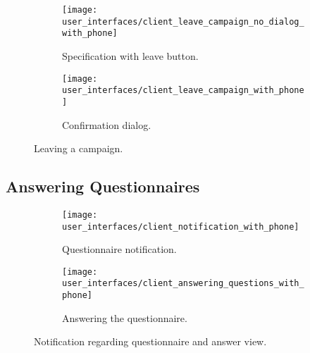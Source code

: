 \begin{figure}[!htbp]
\begin{subfigure}[!t]{.50\textwidth}
  \centering
  \texttt{[image: user\_interfaces/client\_leave\_campaign\_no\_dialog\_with\_phone]}
  \caption{Specification with leave button.}
  \label{fig:leave_campaign_no_dialog}
\end{subfigure}%
\begin{subfigure}[!t]{.50\textwidth}
  \centering
  \texttt{[image: user\_interfaces/client\_leave\_campaign\_with\_phone]}
  \caption{Confirmation dialog.}
  \label{fig:leave_campaign_dialog}
\end{subfigure}
\caption{Leaving a campaign.}
\label{fig:leave_campaign}
\end{figure}
\FloatBarrier

\subsection{Answering Questionnaires}

\begin{figure}[!htbp]
\begin{subfigure}[!t]{.50\textwidth}
  \centering
  \texttt{[image: user\_interfaces/client\_notification\_with\_phone]}
  \caption{Questionnaire notification.}
  \label{fig:answering_questionnaire_notification}
\end{subfigure}%
\begin{subfigure}[!t]{.50\textwidth}
  \centering
  \texttt{[image: user\_interfaces/client\_answering\_questions\_with\_phone]}
  \caption{Answering the questionnaire.}
  \label{fig:answering_questionnaire_answering}
\end{subfigure}
\caption{Notification regarding questionnaire and answer view.}
\label{fig:answering_questionnaire}
\end{figure}
\FloatBarrier